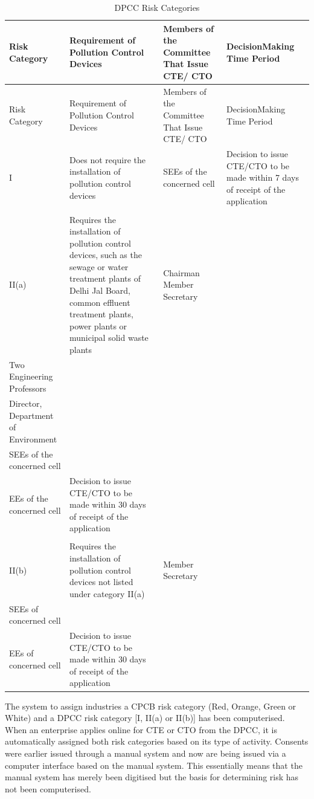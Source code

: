 \documentclass[a4paper, 12pt]{article}
\newcommand\tabitem{\makebox[1em][r]{\textbullet~}}
\begin{document}

\begin{longtable}{>{\raggedright}p{2cm}>{\raggedright}p{4cm}>{\raggedright}p{4cm}>{\raggedright\arraybackslash}p{4cm}}
\caption{DPCC Risk Categories} \\
Risk Category & Requirement of Pollution Control Devices & Members of the Committee That Issue CTE/ CTO & DecisionMaking Time Period \\
\midrule
\endfirsthead
Risk Category & Requirement of Pollution Control Devices & Members of the Committee That Issue CTE/ CTO & DecisionMaking Time Period \\
\midrule
\endhead
\endfoot
\endlastfoot

I & Does not require the installation of pollution control devices & SEEs of the concerned cell & Decision to issue CTE/CTO to be made within 7 days of receipt of the application \\
 & & &  \\
II(a) & Requires the installation of pollution control devices, such as the sewage or water treatment plants of Delhi Jal Board, common effluent treatment plants, power plants or municipal solid waste plants & \tabitem Chairman  \tabitem Member Secretary \\  \tabitem Two Engineering Professors \\ \tabitem Director, Department of Environment \\ \tabitem SEEs of the concerned cell \\ \tabitem EEs of the concerned cell 
 & Decision to issue CTE/CTO to be made within 30 days of receipt of the application \\
  & & & \\
II(b) & Requires the installation of pollution control devices not listed under category II(a) & \tabitem Member Secretary \\ \tabitem SEEs of concerned cell \\ \tabitem  EEs of concerned cell & Decision to issue CTE/CTO to be made within 30 days of receipt of the application \\

\end{longtable}
         
                 
                 The system to assign industries a CPCB risk category (Red, Orange, Green or White) and a DPCC risk category [I, II(a) or II(b)] has been computerised. When an enterprise applies online for CTE or CTO from the DPCC, it is automatically assigned both risk categories based on its type of activity. Consents were earlier issued through a manual system and now are being issued via a computer interface based on the manual system. This essentially means that the manual system has merely been digitised but the basis for determining risk has not been computerised. \\
\end{document}
